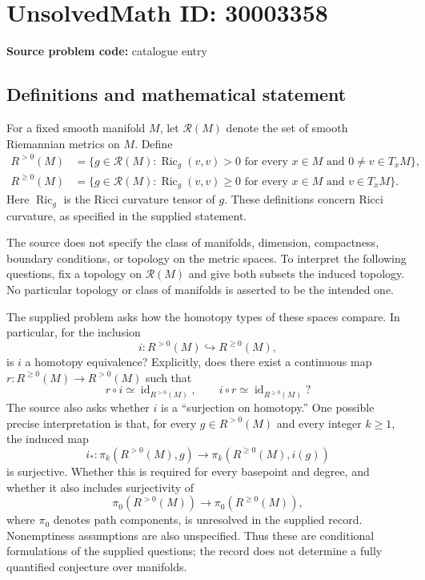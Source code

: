 \documentclass[11pt]{article}
\begin{document}
\section*{UnsolvedMath ID: 30003358}
\textbf{Source problem code:} catalogue entry
\subsection{Definitions and mathematical statement}
For a fixed smooth manifold \(M\), let \(\mathcal R(M)\) denote the set of smooth Riemannian metrics on \(M\). Define
\[
\begin{aligned}
R^{>0}(M)&=\{g\in\mathcal R(M):\operatorname{Ric}_g(v,v)>0\text{ for every }x\in M\text{ and }0\ne v\in T_xM\},\\
R^{\geq0}(M)&=\{g\in\mathcal R(M):\operatorname{Ric}_g(v,v)\geq0\text{ for every }x\in M\text{ and }v\in T_xM\}.
\end{aligned}
\]
Here \(\operatorname{Ric}_g\) is the Ricci curvature tensor of \(g\). These definitions concern Ricci curvature, as specified in the supplied statement.

The source does not specify the class of manifolds, dimension, compactness, boundary conditions, or topology on the metric spaces. To interpret the following questions, fix a topology on \(\mathcal R(M)\) and give both subsets the induced topology. No particular topology or class of manifolds is asserted to be the intended one.

The supplied problem asks how the homotopy types of these spaces compare. In particular, for the inclusion
\[
i:R^{>0}(M)\hookrightarrow R^{\geq0}(M),
\]
is \(i\) a homotopy equivalence? Explicitly, does there exist a continuous map \(r:R^{\geq0}(M)\to R^{>0}(M)\) such that
\[
r\circ i\simeq\operatorname{id}_{R^{>0}(M)},\qquad
i\circ r\simeq\operatorname{id}_{R^{\geq0}(M)}?
\]
The source also asks whether \(i\) is a ``surjection on homotopy.'' One possible precise interpretation is that, for every \(g\in R^{>0}(M)\) and every integer \(k\geq1\), the induced map
\[
i_*:\pi_k(R^{>0}(M),g)\longrightarrow\pi_k(R^{\geq0}(M),i(g))
\]
is surjective. Whether this is required for every basepoint and degree, and whether it also includes surjectivity of
\[
\pi_0(R^{>0}(M))\longrightarrow\pi_0(R^{\geq0}(M)),
\]
where \(\pi_0\) denotes path components, is unresolved in the supplied record. Nonemptiness assumptions are also unspecified. Thus these are conditional formulations of the supplied questions; the record does not determine a fully quantified conjecture over manifolds.
\end{document}
